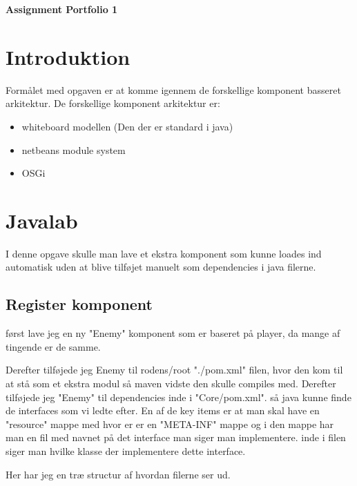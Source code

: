 \begin{center}
{ \LARGE \bfseries Assignment Portfolio 1\\[0.4cm]}
\end{center}

\section{Introduktion}
Formålet med opgaven er at komme igennem de forskellige komponent basseret
arkitektur. De forskellige komponent arkitektur er: 

\begin{itemize}
 \item whiteboard modellen (Den der er standard i java)
 \item netbeans module system
 \item OSGi 
\end{itemize}

\section{Javalab}
I denne opgave skulle man lave et ekstra komponent som kunne loades ind
automatisk uden at blive tilføjet manuelt som dependencies i java filerne.

\subsection{Register komponent}
først lave jeg en ny "Enemy" komponent som er baseret på player, da mange af
tingende er de samme. 

Derefter tilføjede jeg Enemy til rodens/root "./pom.xml" filen, hvor den kom
til at stå som et ekstra modul så maven vidste den skulle compiles med.
Derefter tilføjede jeg "Enemy" til dependencies inde i "Core/pom.xml". så java
kunne finde de interfaces som vi ledte efter.  En af de key items er at man
skal have en "resource" mappe med hvor er er en "META-INF" mappe og i den mappe
har man en fil med navnet på det interface man siger man implementere. inde i filen
siger man hvilke klasse der implementere dette interface.

Her har jeg en træ structur af hvordan filerne ser ud.

